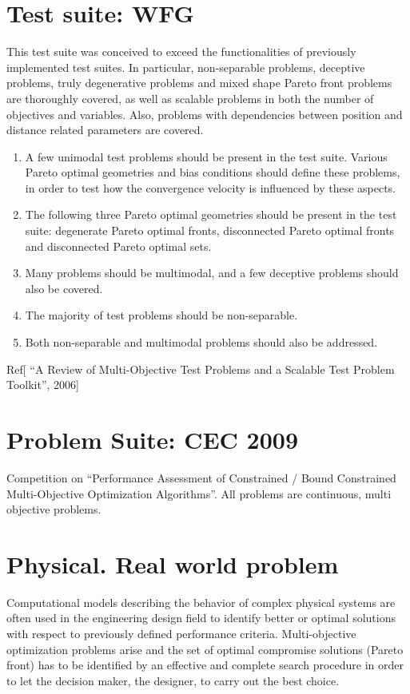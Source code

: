 \section{Test suite: WFG}
This test suite was conceived to exceed the functionalities of previously implemented test suites.
In particular, non-separable problems, deceptive problems, truly degenerative problems and mixed shape Pareto front problems are thoroughly covered, 
as well as scalable problems in both the number of objectives and variables. Also, problems with dependencies between position and distance related parameters are covered.
    \begin{enumerate}

        \item A few unimodal test problems should be present in the test suite. 
        Various Pareto optimal geometries and bias conditions should define these problems, 
        in order to test how the convergence velocity is influenced by these aspects.

        \item The following three Pareto optimal geometries should be present in the test suite: 
        degenerate Pareto optimal fronts, disconnected Pareto optimal fronts and disconnected Pareto optimal sets.

        \item Many problems should be multimodal, and a few deceptive problems should also be covered.
        \item The majority of test problems should be non-separable.
        \item Both non-separable and multimodal problems should also be addressed.
    \end{enumerate}
Ref[ “A Review of Multi-Objective Test Problems and a Scalable Test Problem Toolkit”, 2006]

\section{Problem Suite: CEC 2009}
Competition on “Performance Assessment of Constrained / Bound Constrained Multi-Objective Optimization Algorithms”. All problems are continuous, multi objective problems.

\section{Physical. Real world problem}

    Computational models describing the behavior of complex physical systems are often used in 
    the engineering design field to identify better or optimal solutions with respect to previously 
    defined performance criteria. Multi-objective optimization problems arise and the set of optimal compromise 
    solutions (Pareto front) has to be identified by an effective and complete search procedure in order to let the 
    decision maker, the designer, to carry out the best choice.

